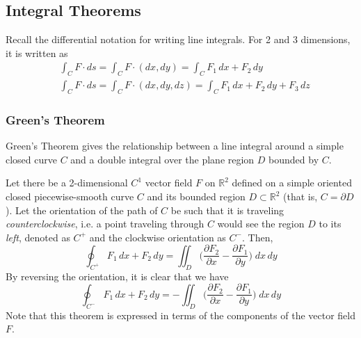 \subsection{Integral Theorems}

  Recall the differential notation for writing line integrals. For 2 and 3 dimensions, it is written as
  \begin{align*}
      & \int_C F \cdot d s = \int_C F \cdot (d x, d y) = \int_C F_1 \, d x + F_2 \, d y \\
      & \int_C F \cdot d s = \int_C F \cdot (d x, d y, d z) = \int_C F_1 \, d x + F_2 \, d y + F_3 \, d z 
  \end{align*}
  \subsubsection{Green's Theorem}
  Green's Theorem gives the relationship between a line integral around a simple closed curve $C$ and a double integral over the plane region $D$ bounded by $C$. 

  \begin{theorem}
  Let there be a 2-dimensional $C^1$ vector field $F$ on $\mathbb{R}^2$ defined on a simple oriented closed piecewise-smooth curve $C$ and its bounded region $D \subset \mathbb{R}^2$ (that is, $C = \partial D$). Let the orientation of the path of $C$ be such that it is traveling \textit{counterclockwise}, i.e. a point traveling through $C$ would see the region $D$ to its \textit{left}, denoted as $C^+$ and the clockwise orientation as $C^-$.  Then, 
  \[\oint_{C^+} F_1 \, d x + F_2 \, d y = \iint_D \bigg( \frac{\partial F_2}{\partial x} - \frac{\partial F_1}{\partial y} \bigg) \; d x \, d y\]
  By reversing the orientation, it is clear that we have
  \[\oint_{C^-} F_1 \, d x + F_2 \, d y = - \iint_D \bigg( \frac{\partial F_2}{\partial x} - \frac{\partial F_1}{\partial y} \bigg) \; d x \, d y\]
  Note that this theorem is expressed in terms of the components of the vector field $F$. 
  \begin{center}
  \end{center}
  \end{theorem}

